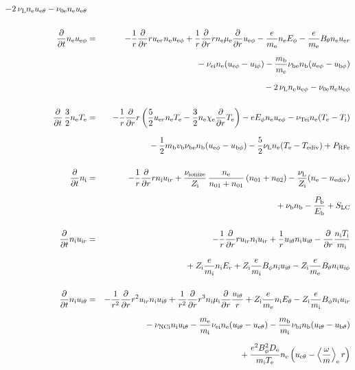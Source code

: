 \documentclass[11pt]{article}
\def\r#1{{\rm#1}}
\def\ddt{\frac{\partial}{\partial t}}
\def\ddr{\frac{\partial}{\partial r}}
\def\ave#1{\left\langle#1\right\rangle}
\def\me{m_\r{e}}
\def\mi{m_\r{i}}
\def\mb{m_\r{b}}
\def\mue{\mu_\r{e}}
\def\mui{\mu_\r{i}}
\def\De{D_\r{e}}
\def\Di{D_\r{i}}
\def\chie{\chi_\r{e}}
\def\ne{n_\r{e}}
\def\ni{n_\r{i}}
\def\nb{n_\r{b}}
\def\uer{u_{\r{e}r}}
\def\uir{u_{\r{i}r}}
\def\ueth{u_{\r{e}\theta}}
\def\uith{u_{\r{i}\theta}}
\def\ubth{u_{\r{b}\theta}}
\def\ueph{u_{\r{e}\phi}}
\def\uiph{u_{\r{i}\phi}}
\def\ubph{u_{\r{b}\phi}}
\def\Er{E_r}
\def\Eth{E_\theta}
\def\Eph{E_\phi}
\def\Bth{B_\theta}
\def\Bph{B_\phi}
\def\Te{T_\r{e}}
\def\Ti{T_\r{i}}
\def\nna{n_{01}}
\def\nnb{n_{02}}
\def\Zi{Z_\r{i}}
\def\Pb{P_\r{b}}
\def\Eb{E_\r{b}}
\def\PRFe{P_\r{RFe}}
\def\nuNCi{\nu_\r{NCi}}
\def\nuei{\nu_\r{ei}}
\def\nube{\nu_\r{be}}
\def\nune{\nu_\r{0e}}
\def\nuL{\nu_\r{L}}
\def\nuion{\nu_\r{ionize}}
\def\nub{\nu_\r{b}}
\def\nuTei{\nu_\r{Tei}}
\def\vb{v_\r{b}}
\def\nediv{n_\r{ediv}}
\def\Tediv{T_\r{ediv}}
\newcommand{\Frac}[2]{%
  {\displaystyle {\displaystyle #1\over \displaystyle #2}}%
}
\newcommand{\rdprd}[2]{\Frac{\partial #1}{\partial #2}}
\newcommand{\aveaveB}[1]{\left< \!\! \left< #1 \right> \!\! \right>}
\begin{document}
\begin{eqnarray}
%
  - 2\, \nuL \ne \ueth
%
  - \nune \ne \ueth
\\[5mm]
%
%
  \ddt \ne \ueph &=&
%
  - \frac{1}{r} \ddr r \uer \ne \ueph
%
  + \frac{1}{r} \ddr r \ne \mue \ddr \ueph
%
  - \frac{e}{\me} \ne \Eph
%
  - \frac{e}{\me} \Bth \ne \uer 
\nonumber\\[2.5mm]&&{}
%
  - \nuei \ne (\ueph - \uiph)
%
  - \frac{\mb}{\me} \nube \nb (\ueph - \ubph)
\nonumber\\[2.5mm]&&{}
%
  - 2\, \nuL \ne \ueph
%
  - \nune \ne \ueph
\\[5mm]
%
%
  \ddt \, \frac{3}{2} \ne \Te &=&
%
 - \frac{1}{r} \ddr r
   \left( \frac{5}{2} \uer \ne \Te - \frac{3}{2} \ne \chie \ddr \Te \right)
%
  -  e \Eph \ne \ueph 
%
  - \nuTei \ne (\Te - \Ti)
\nonumber\\[2.5mm]&&{}
%
  - \frac{1}{2} \mb \vb \nube \nb (\ueph - \ubph)
%
  - \frac{5}{2} \nuL \ne (\Te - \Tediv)
%
  + \PRFe
\\[5mm]
%
%
  \ddt\ni &=&
%
  - \frac{1}{r} \ddr r \ni \uir
%
  + \frac{\nuion}{\Zi}\, \frac{\ne}{\nna+\nna}\, (\nna+\nnb)
%
  - \frac{\nuL}{\Zi} (\ne - \nediv) 
\nonumber\\[2.5mm]&&{}
%
  + \nub \nb
%
  - \frac{\Pb}{\Eb}
%
  + S_\r{LC}
\\[5mm]
%
%
  \ddt \ni \uir &=&
%
  - \frac{1}{r} \ddr r \uir \ni \uir
%
  + \frac{1}{r} \uith \ni \uith
%
  - \ddr \frac{\ni \Ti}{\mi}
\nonumber\\[3mm]&&{}
%
  + \Zi \frac{e}{\mi}\ni \Er
%
  + \Zi \frac{e}{\mi} \Bph \ni \uith
%
  - \Zi \frac{e}{\me} \Bth \ni \uiph
\\[5mm]
%
%
  \ddt \ni \uith &=&
%
  - \frac{1}{r^2} \ddr r^2 \uir \ni \uith
%
  + \frac{1}{r^2} \ddr r^3 \ni \mui \ddr \frac{\uith}{r}
%
  + \Zi \frac{e}{\me} \ni \Eth
%
  - \Zi \frac{e}{\mi} \Bph \ni \uir
\nonumber\\[2.5mm]&&{}
%
  - \nuNCi \ni \uith
%
  - \frac{\me}{\mi} \nuei \ne (\uith - \ueth)
%
  - \frac{\mb}{\mi} \nu_\r{bi} \nb (\uith - \ubth)
\nonumber\\[2.5mm]&&{}
%
  + \frac{e^2 \Bph^2 \De}{\mi\Te}\ne
    \left(\ueth - \ave{\frac{\omega}{m}}_\r{e} r \right)

\end{eqnarray}
\end{document}
